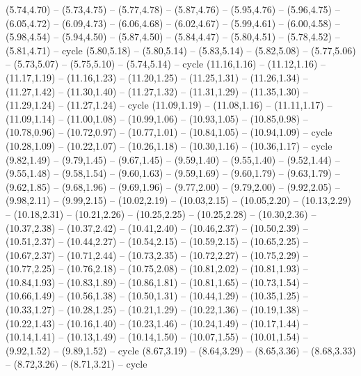 \expandafter\def\csname geo:gebiet:ESP\endcsname{
  (5.74,4.70) -- (5.73,4.75) -- (5.77,4.78) -- (5.87,4.76) -- (5.95,4.76) -- (5.96,4.75) -- (6.05,4.72) -- (6.09,4.73) -- (6.06,4.68) -- (6.02,4.67) -- (5.99,4.61) -- (6.00,4.58) -- (5.98,4.54) -- (5.94,4.50) -- (5.87,4.50) -- (5.84,4.47) -- (5.80,4.51) -- (5.78,4.52) -- (5.81,4.71) -- cycle}
\expandafter\def\csname geo:gebiet:IRL\endcsname{
  (5.80,5.18) -- (5.80,5.14) -- (5.83,5.14) -- (5.82,5.08) -- (5.77,5.06) -- (5.73,5.07) -- (5.75,5.10) -- (5.74,5.14) -- cycle}
\expandafter\def\csname geo:gebiet:NCL\endcsname{
  }
\expandafter\def\csname geo:gebiet:SLB\endcsname{
  }
\expandafter\def\csname geo:gebiet:NZL\endcsname{
  (11.16,1.16) -- (11.12,1.16) -- (11.17,1.19) -- (11.16,1.23) -- (11.20,1.25) -- (11.25,1.31) -- (11.26,1.34) -- (11.27,1.42) -- (11.30,1.40) -- (11.27,1.32) -- (11.31,1.29) -- (11.35,1.30) -- (11.29,1.24) -- (11.27,1.24) -- cycle
  (11.09,1.19) -- (11.08,1.16) -- (11.11,1.17) -- (11.09,1.14) -- (11.00,1.08) -- (10.99,1.06) -- (10.93,1.05) -- (10.85,0.98) -- (10.78,0.96) -- (10.72,0.97) -- (10.77,1.01) -- (10.84,1.05) -- (10.94,1.09) -- cycle}
\expandafter\def\csname geo:gebiet:AUS\endcsname{
  (10.28,1.09) -- (10.22,1.07) -- (10.26,1.18) -- (10.30,1.16) -- (10.36,1.17) -- cycle
  (9.82,1.49) -- (9.79,1.45) -- (9.67,1.45) -- (9.59,1.40) -- (9.55,1.40) -- (9.52,1.44) -- (9.55,1.48) -- (9.58,1.54) -- (9.60,1.63) -- (9.59,1.69) -- (9.60,1.79) -- (9.63,1.79) -- (9.62,1.85) -- (9.68,1.96) -- (9.69,1.96) -- (9.77,2.00) -- (9.79,2.00) -- (9.92,2.05) -- (9.98,2.11) -- (9.99,2.15) -- (10.02,2.19) -- (10.03,2.15) -- (10.05,2.20) -- (10.13,2.29) -- (10.18,2.31) -- (10.21,2.26) -- (10.25,2.25) -- (10.25,2.28) -- (10.30,2.36) -- (10.37,2.38) -- (10.37,2.42) -- (10.41,2.40) -- (10.46,2.37) -- (10.50,2.39) -- (10.51,2.37) -- (10.44,2.27) -- (10.54,2.15) -- (10.59,2.15) -- (10.65,2.25) -- (10.67,2.37) -- (10.71,2.44) -- (10.73,2.35) -- (10.72,2.27) -- (10.75,2.29) -- (10.77,2.25) -- (10.76,2.18) -- (10.75,2.08) -- (10.81,2.02) -- (10.81,1.93) -- (10.84,1.93) -- (10.83,1.89) -- (10.86,1.81) -- (10.81,1.65) -- (10.73,1.54) -- (10.66,1.49) -- (10.56,1.38) -- (10.50,1.31) -- (10.44,1.29) -- (10.35,1.25) -- (10.33,1.27) -- (10.28,1.25) -- (10.21,1.29) -- (10.22,1.36) -- (10.19,1.38) -- (10.22,1.43) -- (10.16,1.40) -- (10.23,1.46) -- (10.24,1.49) -- (10.17,1.44) -- (10.14,1.41) -- (10.13,1.49) -- (10.14,1.50) -- (10.07,1.55) -- (10.01,1.54) -- (9.92,1.52) -- (9.89,1.52) -- cycle}
\expandafter\def\csname geo:gebiet:LKA\endcsname{
  (8.67,3.19) -- (8.64,3.29) -- (8.65,3.36) -- (8.68,3.33) -- (8.72,3.26) -- (8.71,3.21) -- cycle}
